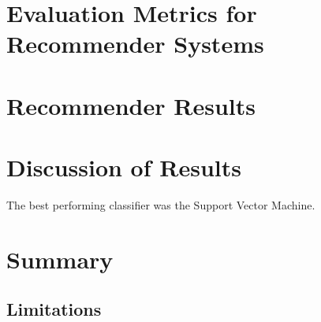 \section{Evaluation Metrics for Recommender Systems}

\section{Recommender Results}

\section{Discussion of Results}

The best performing classifier was the Support Vector Machine.

\section{Summary}

\subsection*{Limitations}
